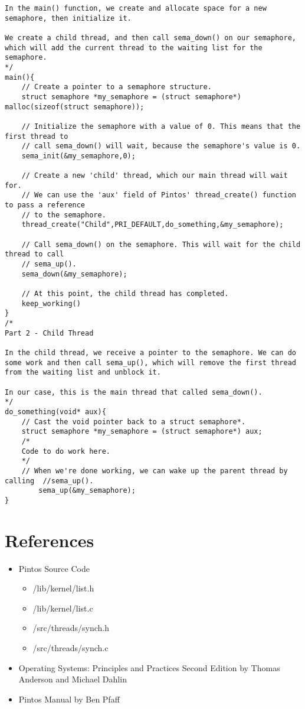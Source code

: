 \documentclass[11pt, letterpaper]{article}
\begin{document}
\begin{appendices}
\begin{lstlisting}[frame=single,basicstyle=\footnotesize]
In the main() function, we create and allocate space for a new semaphore, then initialize it. 

We create a child thread, and then call sema_down() on our semaphore, which will add the current thread to the waiting list for the semaphore.
*/
main(){
	// Create a pointer to a semaphore structure.
	struct semaphore *my_semaphore = (struct semaphore*) malloc(sizeof(struct semaphore));

	// Initialize the semaphore with a value of 0. This means that the first thread to
	// call sema_down() will wait, because the semaphore's value is 0.
	sema_init(&my_semaphore,0);

	// Create a new 'child' thread, which our main thread will wait for.
	// We can use the 'aux' field of Pintos' thread_create() function to pass a reference
	// to the semaphore.
	thread_create("Child",PRI_DEFAULT,do_something,&my_semaphore);
	
	// Call sema_down() on the semaphore. This will wait for the child thread to call
	// sema_up().
	sema_down(&my_semaphore);
	
	// At this point, the child thread has completed.
	keep_working()
}
/*
Part 2 - Child Thread

In the child thread, we receive a pointer to the semaphore. We can do some work and then call sema_up(), which will remove the first thread from the waiting list and unblock it.

In our case, this is the main thread that called sema_down().
*/
do_something(void* aux){
	// Cast the void pointer back to a struct semaphore*.
	struct semaphore *my_semaphore = (struct semaphore*) aux;
	/*
	Code to do work here.
	*/
	// When we're done working, we can wake up the parent thread by calling  //sema_up().
		sema_up(&my_semaphore);
}
\end{lstlisting}

\end{appendices}

\pagebreak

\section*{References}

\begin{itemize}
\item Pintos Source Code
	\begin{itemize}
	\item /lib/kernel/list.h
	\item /lib/kernel/list.c
	\item /src/threads/synch.h
	\item /src/threads/synch.c
	\end{itemize}
\item Operating Systems: Principles and Practices Second Edition by Thomas Anderson and Michael Dahlin
\item Pintos Manual by Ben Pfaff
\end{itemize}
	
\end{document}
